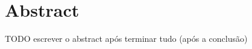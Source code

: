 \documentclass[12pt,twoside,openright]{report}
\begin{document}
\chapter*{Abstract}
TODO escrever o abstract após terminar tudo (após a conclusão)

\tableofcontents
{}



















\appendix


\printbibliography
\end{document}
